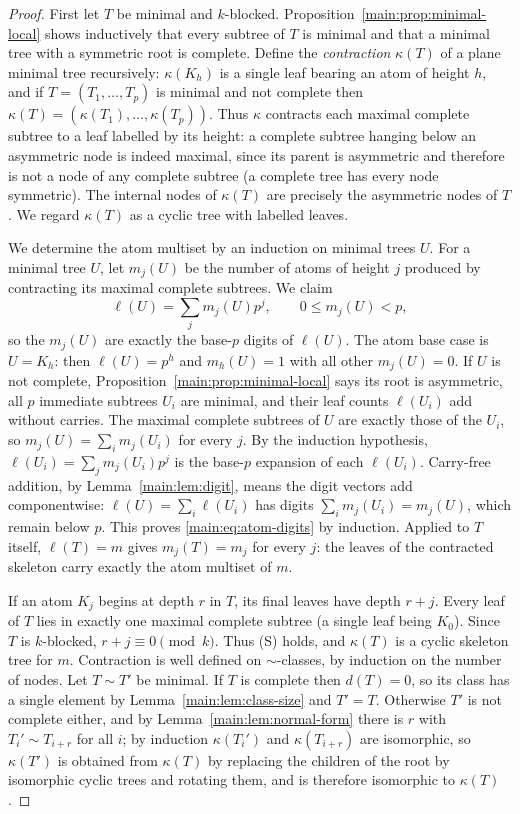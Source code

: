 \documentclass[11pt]{article}
\theoremstyle{definition}
\theoremstyle{remark}
\numberwithin{equation}{section}
\numberwithin{figure}{section}
\begin{document}
\begin{proof}
First let $T$ be minimal and $k$-blocked.  Proposition~\ref{main:prop:minimal-local} shows inductively that every subtree of $T$ is minimal and that a minimal tree with a symmetric root is complete.  Define the \emph{contraction} $\kappa(T)$ of a plane minimal tree recursively: $\kappa(K_h)$ is a single leaf bearing an atom of height $h$, and if $T=(T_1,\ldots,T_p)$ is minimal and not complete then $\kappa(T)=(\kappa(T_1),\ldots,\kappa(T_p))$.  Thus $\kappa$ contracts each maximal complete subtree to a leaf labelled by its height: a complete subtree hanging below an asymmetric node is indeed maximal, since its parent is asymmetric and therefore is not a node of any complete subtree (a complete tree has every node symmetric).  The internal nodes of $\kappa(T)$ are precisely the asymmetric nodes of $T$.  We regard $\kappa(T)$ as a cyclic tree with labelled leaves.

We determine the atom multiset by an induction on minimal trees $U$.  For a minimal tree $U$, let $m_j(U)$ be the number of atoms of height $j$ produced by contracting its maximal complete subtrees.  We claim
\begin{equation}\label{main:eq:atom-digits}
 \ell(U)=\sum_j m_j(U)p^j,\qquad 0\le m_j(U)<p,
\end{equation}
so the $m_j(U)$ are exactly the base-$p$ digits of $\ell(U)$.  The atom base case is $U=K_h$: then $\ell(U)=p^h$ and $m_h(U)=1$ with all other $m_j(U)=0$.  If $U$ is not complete, Proposition~\ref{main:prop:minimal-local} says its root is asymmetric, all $p$ immediate subtrees $U_i$ are minimal, and their leaf counts $\ell(U_i)$ add without carries.  The maximal complete subtrees of $U$ are exactly those of the $U_i$, so $m_j(U)=\sum_i m_j(U_i)$ for every $j$.  By the induction hypothesis, $\ell(U_i)=\sum_j m_j(U_i)p^j$ is the base-$p$ expansion of each $\ell(U_i)$.  Carry-free addition, by Lemma~\ref{main:lem:digit}, means the digit vectors add componentwise: $\ell(U)=\sum_i\ell(U_i)$ has digits $\sum_i m_j(U_i)=m_j(U)$, which remain below $p$.  This proves \eqref{main:eq:atom-digits} by induction.  Applied to $T$ itself, $\ell(T)=m$ gives $m_j(T)=m_j$ for every $j$: the leaves of the contracted skeleton carry exactly the atom multiset of $m$.

If an atom $K_j$ begins at depth $r$ in $T$, its final leaves have depth $r+j$.  Every leaf of $T$ lies in exactly one maximal complete subtree (a single leaf being $K_0$).  Since $T$ is $k$-blocked, $r+j\equiv0\pmod k$.  Thus (S) holds, and $\kappa(T)$ is a cyclic skeleton tree for $m$.  Contraction is well defined on $\sim$-classes, by induction on the number of nodes.  Let $T\sim T'$ be minimal.  If $T$ is complete then $d(T)=0$, so its class has a single element by Lemma~\ref{main:lem:class-size} and $T'=T$.  Otherwise $T'$ is not complete either, and by Lemma~\ref{main:lem:normal-form} there is $r$ with $T_i'\sim T_{i+r}$ for all $i$; by induction $\kappa(T_i')$ and $\kappa(T_{i+r})$ are isomorphic, so $\kappa(T')$ is obtained from $\kappa(T)$ by replacing the children of the root by isomorphic cyclic trees and rotating them, and is therefore isomorphic to $\kappa(T)$.


\end{proof}
\end{document}
